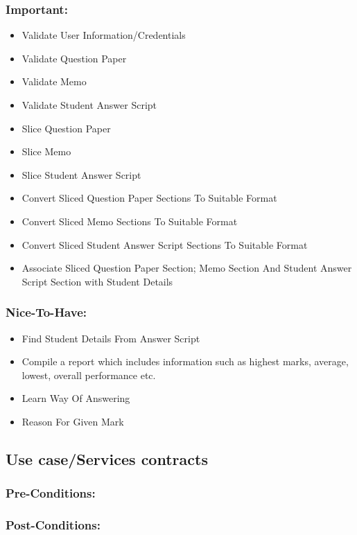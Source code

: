\documentclass{article}
\begin{document}
		\subsubsection{Important:}
			\begin{itemize}
				\item Validate User Information/Credentials
				\item Validate Question Paper
				\item Validate Memo
				\item Validate Student Answer Script
				\item Slice Question Paper
				\item Slice Memo
				\item Slice Student Answer Script
				\item Convert Sliced Question Paper Sections To Suitable Format
				\item Convert Sliced Memo Sections To Suitable Format
				\item Convert Sliced Student Answer Script Sections To Suitable Format
				\item Associate Sliced Question Paper Section; Memo Section And Student Answer Script Section with Student Details
				
			\end{itemize}
		\subsubsection{Nice-To-Have:}
			\begin{itemize}
				\item Find Student Details From Answer Script
				\item Compile a report which includes information such as highest marks, average, lowest, overall performance etc.
				\item Learn Way Of Answering
				\item Reason For Given Mark
			
			\end{itemize}
	\subsection{Use case/Services contracts}
		\subsubsection{Pre-Conditions:}
		\subsubsection{Post-Conditions:}
\end{document}
